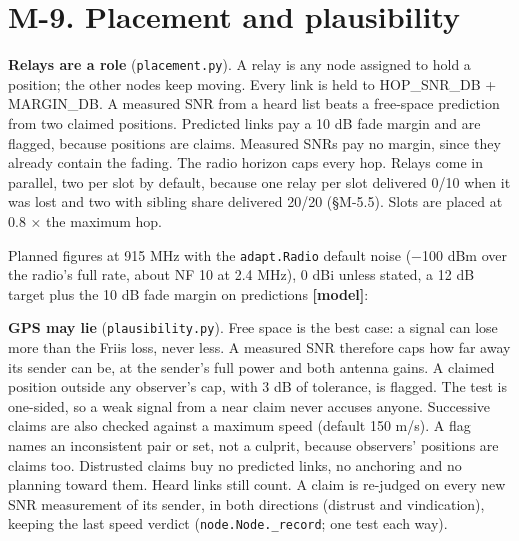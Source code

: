 \documentclass[10pt,letterpaper,twocolumn]{article}
\begin{document}
\section{M-9. Placement and plausibility}\label{m-9-placement-and-plausibility}

\textbf{Relays are a role} (\texttt{placement.\allowbreak{}py}). A relay is any node assigned to hold a position; the other nodes keep moving. Every link is held to HOP\_SNR\_DB + MARGIN\_DB. A measured SNR from a heard list beats a free-space prediction from two claimed positions. Predicted links pay a 10 dB fade margin and are flagged, because positions are claims. Measured SNRs pay no margin, since they already contain the fading. The radio horizon caps every hop. Relays come in parallel, two per slot by default, because one relay per slot delivered 0/10 when it was lost and two with sibling share delivered 20/20 (§M-5.5). Slots are placed at 0.8 × the maximum hop.

Planned figures at 915 MHz with the \texttt{adapt.\allowbreak{}Radio} default noise (−100 dBm over the radio's full rate, about NF 10 at 2.4 MHz), 0 dBi unless stated, a 12 dB target plus the 10 dB fade margin on predictions \textbf{{[}model{]}}:


\textbf{GPS may lie} (\texttt{plausibility.\allowbreak{}py}). Free space is the best case: a signal can lose more than the Friis loss, never less. A measured SNR therefore caps how far away its sender can be, at the sender's full power and both antenna gains. A claimed position outside any observer's cap, with 3 dB of tolerance, is flagged. The test is one-sided, so a weak signal from a near claim never accuses anyone. Successive claims are also checked against a maximum speed (default 150 m/s). A flag names an inconsistent pair or set, not a culprit, because observers' positions are claims too. Distrusted claims buy no predicted links, no anchoring and no planning toward them. Heard links still count. A claim is re-judged on every new SNR measurement of its sender, in both directions (distrust and vindication), keeping the last speed verdict (\texttt{node.\allowbreak{}Node.\allowbreak{}\_\allowbreak{}record}; one test each way).
\end{document}
